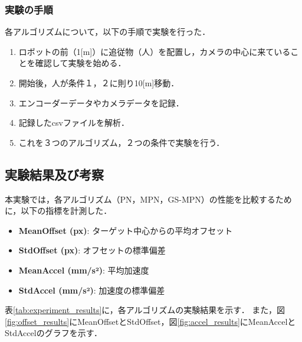 \subsubsection{実験の手順}
各アルゴリズムについて，以下の手順で実験を行った．
\begin{enumerate}
    \item ロボットの前（1[m]）に追従物（人）を配置し，カメラの中心に来ていることを確認して実験を始める．
    \item 開始後，人が条件１，２に則り10[m]移動．
    \item エンコーダーデータやカメラデータを記録．
    \item 記録したcsvファイルを解析．
    \item これを３つのアルゴリズム，２つの条件で実験を行う．
\end{enumerate}

\subsection{実験結果及び考察}
本実験では，各アルゴリズム（PN，MPN，GS-MPN）の性能を比較するために，以下の指標を計測した．
\begin{itemize}
    \item \textbf{MeanOffset (px)}: ターゲット中心からの平均オフセット
    \item \textbf{StdOffset (px)}: オフセットの標準偏差
    \item \textbf{MeanAccel (mm/s²)}: 平均加速度
    \item \textbf{StdAccel (mm/s²)}: 加速度の標準偏差
\end{itemize}

表\ref{tab:experiment_results}に，各アルゴリズムの実験結果を示す．
また，図\ref{fig:offset_results}にMeanOffsetとStdOffset，図\ref{fig:accel_results}にMeanAccelとStdAccelのグラフを示す．

